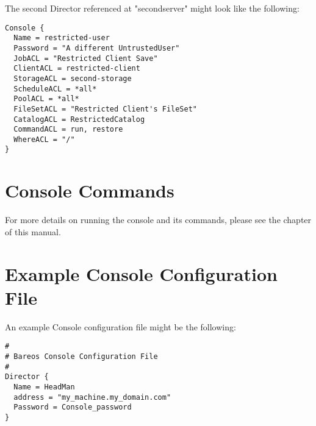 The second Director referenced at "secondserver" might look
like the following:

\footnotesize
\begin{verbatim}
Console {
  Name = restricted-user
  Password = "A different UntrustedUser"
  JobACL = "Restricted Client Save"
  ClientACL = restricted-client
  StorageACL = second-storage
  ScheduleACL = *all*
  PoolACL = *all*
  FileSetACL = "Restricted Client's FileSet"
  CatalogACL = RestrictedCatalog
  CommandACL = run, restore
  WhereACL = "/"
}
\end{verbatim}
\normalsize



\section{Console Commands}

For more details on running the console and its commands, please see the
 chapter of this manual.

\section{Example Console Configuration File}


An example Console configuration file might be the following:

\footnotesize
\begin{verbatim}
#
# Bareos Console Configuration File
#
Director {
  Name = HeadMan
  address = "my_machine.my_domain.com"
  Password = Console_password
}
\end{verbatim}
\normalsize
